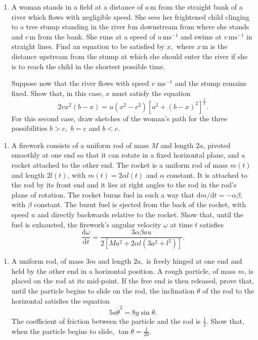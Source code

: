 \documentclass[a4, 11pt]{report}
\newlength{\qspace}
\newcounter{qnumber}
\newenvironment{question}%
 {\vspace{\qspace}
  \begin{enumerate}[\bfseries 1\quad][10]%
    \setcounter{enumi}{\value{qnumber}}%
    \item%
 }
{
  \end{enumerate}
  \filbreak
  \stepcounter{qnumber}
 }
\begin{document}
	
\begin{question}
A woman stands in a field at a distance of $a\,\mathrm{m}$ from the
straight bank of a river which flows with negligible speed. She sees
her frightened child clinging to a tree stump standing in the river
$b\,\mathrm{m}$ downstream from where she stands and $c\,\mathrm{m}$
from the bank. She runs at a speed of $u\,\mathrm{ms}^{-1}$ and swims
at $v\,\mathrm{ms}^{-1}$ in straight lines. Find an equation to be
satisfied by $x,$ where $x\,\mathrm{m}$ is the distance upstream from the
stump at which she should enter the river if she is to reach the child
in the shortest possible time. 


Suppose now that the river flows with speed $v$ ms$^{-1}$ and the
stump remains fixed. Show that, in this case, $x$ must satisfy the
equation 
\[
2vx^{2}(b-x)=u(x^{2}-c^{2})[a^{2}+(b-x)^{2}]^{\frac{1}{2}}.
\]
For this second case, draw sketches of the woman's path for the three
possibilities $b>c,$ $b=c$ and $b<c$. 

	\end{question}
	
\begin{question}	
A firework consists of a uniform rod of mass $M$ and length $2a$,
pivoted smoothly at one end so that it can rotate in a fixed horizontal
plane, and a rocket attached to the other end. The rocket is a uniform
rod of mass $m(t)$ and length $2l(t)$, with $m(t)=2\alpha l(t)$
and $\alpha$ constant. It is attached to the rod by its front end
and it lies at right angles to the rod in the rod's plane of rotation.
The rocket burns fuel in such a way that $\mathrm{d}m/\mathrm{d}t=-\alpha\beta,$
with $\beta$ constant. The burnt fuel is ejected from the back of
the rocket, with speed $u$ and directly backwards relative to the
rocket. Show that, until the fuel is exhausted, the firework's angular
velocity $\omega$ at time $t$ satisfies 
\[
\frac{\mathrm{d}\omega}{\mathrm{d}t}=\frac{3\alpha\beta au}{2[Ma^{2}+2\alpha l(3a^{2}+l^{2})]}.
\] 
\end{question}


\begin{question}
A uniform rod, of mass $3m$ and length $2a,$ is freely hinged at
one end and held by the other end in a horizontal position. A rough
particle, of mass $m$, is placed on the rod at its mid-point. If
the free end is then released, prove that, until the particle begins
to slide on the rod, the inclination $\theta$ of the rod to the horizontal
satisfies the equation 
\[
5a\dot{\theta}^{2}=8g\sin\theta.
\]
The coefficient of friction between the particle and the rod is $\frac{1}{2}.$
Show that, when the particle begins to slide, $\tan\theta=\frac{1}{26}.$
\end{question}
	
\end{document}

